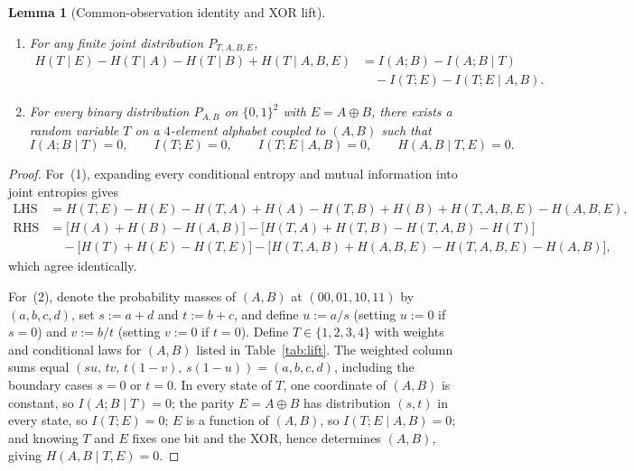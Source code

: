 \documentclass[11pt]{article}
\theoremstyle{plain}
\newtheorem{lemma}[theorem]{Lemma}
\theoremstyle{definition}
\theoremstyle{remark}
\begin{document}
\begin{lemma}[Common-observation identity and XOR lift]\label{lem:lift}
\leavevmode
\begin{enumerate}[label=\textup{(\arabic*)}]
\item For any finite joint distribution $P_{T, A, B, E}$,
\begin{equation}\label{eq:identity}
\begin{split}
H(T \mid E) - H(T \mid A) - H(T \mid B) + H(T \mid A, B, E)
&= I(A; B) - I(A; B \mid T) \\
&\quad - I(T; E) - I(T; E \mid A, B).
\end{split}
\end{equation}
\item For every binary distribution $P_{A, B}$ on $\{0, 1\}^2$ with $E = A \oplus B$, there exists a random variable $T$ on a $4$-element alphabet coupled to $(A, B)$ such that
\begin{equation}\label{eq:lift-props}
I(A; B \mid T) = 0, \qquad I(T; E) = 0, \qquad I(T; E \mid A, B) = 0, \qquad H(A, B \mid T, E) = 0.
\end{equation}
\end{enumerate}
\end{lemma}

\begin{proof}
For~(1), expanding every conditional entropy and mutual information into joint entropies gives
\begin{align*}
\text{LHS} &= H(T, E) - H(E) - H(T, A) + H(A) - H(T, B) + H(B) + H(T, A, B, E) - H(A, B, E), \\
\text{RHS} &= \bigl[H(A) + H(B) - H(A, B)\bigr] - \bigl[H(T, A) + H(T, B) - H(T, A, B) - H(T)\bigr] \\
&\quad - \bigl[H(T) + H(E) - H(T, E)\bigr] - \bigl[H(T, A, B) + H(A, B, E) - H(T, A, B, E) - H(A, B)\bigr],
\end{align*}
which agree identically.

For~(2), denote the probability masses of $(A, B)$ at $(00, 01, 10, 11)$ by $(a, b, c, d)$, set $s := a + d$ and $t := b + c$, and define $u := a/s$ (setting $u := 0$ if $s = 0$) and $v := b/t$ (setting $v := 0$ if $t = 0$).
Define $T \in \{1, 2, 3, 4\}$ with weights and conditional laws for $(A, B)$ listed in Table~\ref{tab:lift}.
The weighted column sums equal $(su,\, tv,\, t(1 - v),\, s(1 - u)) = (a, b, c, d)$, including the boundary cases $s = 0$ or $t = 0$.
In every state of $T$, one coordinate of $(A, B)$ is constant, so $I(A; B \mid T) = 0$; the parity $E = A \oplus B$ has distribution $(s, t)$ in every state, so $I(T; E) = 0$; $E$ is a function of $(A, B)$, so $I(T; E \mid A, B) = 0$; and knowing $T$ and $E$ fixes one bit and the XOR, hence determines $(A, B)$, giving $H(A, B \mid T, E) = 0$.
\end{proof}
\end{document}
